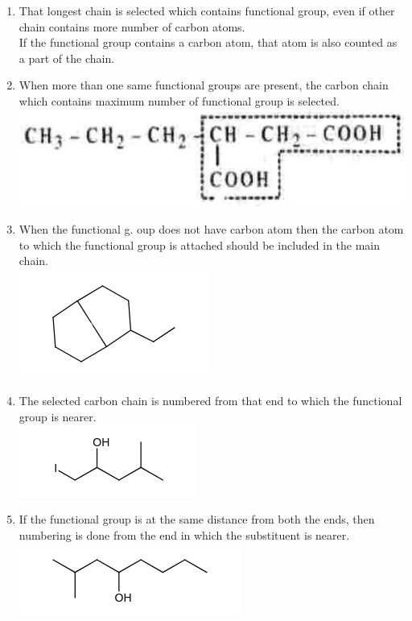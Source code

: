 \documentclass[10pt]{article}
\begin{document}
\begin{enumerate}
  \item That longest chain is selected which contains functional group, even if other chain contains more number of carbon atoms.\\
If the functional group contains a carbon atom, that atom is also counted as a part of the chain.\\

  \item When more than one same functional groups are present, the carbon chain which contains maximum number of functional group is selected.\\
\includegraphics[max width=\textwidth, center]{2025_01_28_8470952b98110cec3aabg-023}
  \item When the functional g. oup does not have carbon atom then the carbon atom to which the functional group is attached should be included in the main chain.\\
\includegraphics{smile-0109eddd72f35dbda6283f35735f1142c3dea5f7}
  \item The selected carbon chain is numbered from that end to which the functional group is nearer.\\
\includegraphics{smile-d36b8deb34db6bcbdd0c78430fd5279cf93fd845}
  \item If the functional group is at the same distance from both the ends, then numbering is done from the end in which the substituent is nearer.\\
\includegraphics{smile-21723bae0da3cc8adf43f23f7e7a3fb65337480e}

\end{enumerate}
\end{document}
